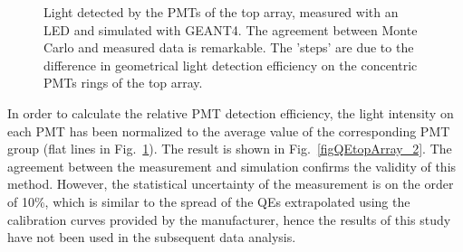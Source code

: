 \begin{figure}[!h]
\centering
{}
\caption[Light detected by the PMTs of the top array, measured with an LED and simulated with GEANT4]{Light detected by the PMTs of the top array, measured with an LED and simulated with GEANT4. The agreement between Monte Carlo and measured data is remarkable. The 'steps' are due to the difference in geometrical light detection efficiency on the concentric PMTs rings of the top array.}
\label{figDetectedLight}
\end{figure}

In order to calculate the relative PMT detection efficiency, the light intensity on each PMT has been normalized to the average value of the corresponding PMT group (flat lines in Fig.~\ref{figDetectedLight}). The result is shown in Fig.~\ref{figQEtopArray_2}. 
The agreement between the measurement and simulation confirms the validity of this method.  However, the statistical uncertainty of the measurement is on the order of 10\%, which is similar to the spread of the QEs extrapolated using the calibration curves provided by the manufacturer, hence the results of this study have not been used in the subsequent data analysis.


